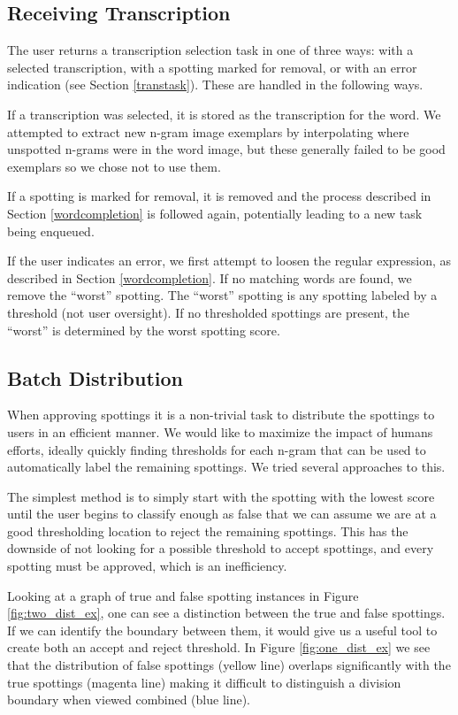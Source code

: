 \documentclass[ms,electronic,twosidetoc,letterpaper,chaptercenter,parttop,lof,lot]{byumsphd}
\begin{document}
\subsection{Receiving Transcription}
The user returns a transcription selection task in one of three ways: with a selected transcription, with a spotting marked for removal, or with an error indication (see Section \ref{transtask}). These are handled in the following ways.

If a transcription was selected, it is stored as the transcription for the word. We attempted to extract new n-gram image exemplars by interpolating where unspotted n-grams were in the word image, but these generally failed to be good exemplars so we chose not to use them.

If a spotting is marked for removal, it is removed and the process described in Section \ref{wordcompletion} is followed again, potentially leading to a new task being enqueued.

If the user indicates an error, we first attempt to loosen the regular expression, as described in Section \ref{wordcompletion}. If no matching words are found, we remove the ``worst'' spotting. The ``worst'' spotting is any spotting labeled by a threshold (not user oversight). If no thresholded spottings are present, the ``worst'' is determined by the worst spotting score.


\subsection{Batch Distribution}
When approving spottings it is a non-trivial task to distribute the spottings to users in an efficient manner. We would like to maximize the impact of humans efforts, ideally quickly finding thresholds for each n-gram that can be used to automatically label the remaining spottings. We tried several approaches to this.

The simplest method is to simply start with the spotting with the lowest score until the user begins to classify enough as false that  we can assume we are at a good thresholding location to reject the remaining spottings. 
This has the downside of not looking for a possible threshold to accept spottings, and every spotting must be approved, which is an inefficiency.


Looking at a graph of true and false spotting instances in Figure \ref{fig:two_dist_ex}, one can see a distinction between the true and false spottings. If we can identify the boundary between them, it would give us a useful tool to create both an accept and reject threshold. 
In Figure \ref{fig:one_dist_ex} we see that the distribution of false spottings (yellow line) overlaps significantly with the true spottings (magenta line) making it difficult to distinguish a division boundary when viewed combined (blue line).
\end{document}
